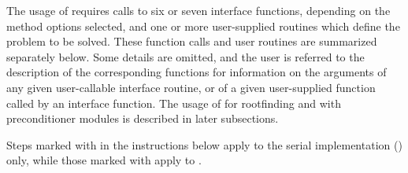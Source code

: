 The usage of {\fcvode} requires calls to six or seven interface
functions, depending on the method options selected, and one or more
user-supplied routines which define the problem to be solved.  These
function calls and user routines are summarized separately below.
Some details are omitted, and the user is referred to the description
of the corresponding {\cvode} functions for information on the arguments 
of any given user-callable interface routine, or of a given user-supplied 
function called by an interface function.
The usage of {\fcvode} for rootfinding and with preconditioner modules is
described in later subsections.

Steps marked with {\s} in the instructions below apply to the serial
{\nvector} implementation ({\nvecs}) only, while those marked with {\p}
apply to {\nvecp}.

